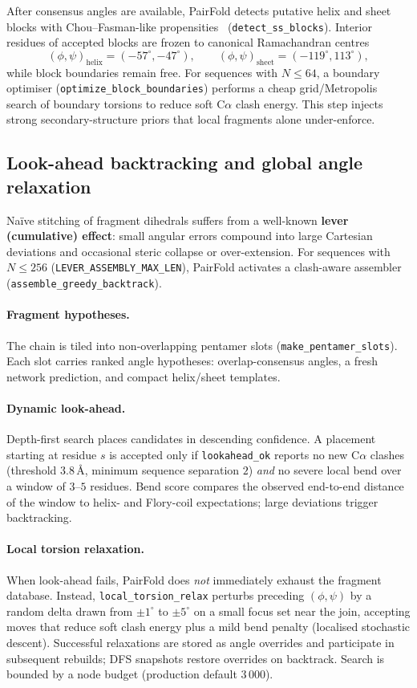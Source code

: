 \documentclass[11pt,a4paper]{article}
\begin{document}
After consensus angles are available, PairFold detects putative helix and sheet blocks with Chou--Fasman-like propensities~\citep{chou1974prediction} (\texttt{detect\_ss\_blocks}).
Interior residues of accepted blocks are frozen to canonical Ramachandran centres
\[
  (\phi,\psi)_{\mathrm{helix}} = (-57^\circ,-47^\circ),\qquad
  (\phi,\psi)_{\mathrm{sheet}} = (-119^\circ,113^\circ),
\]
while block boundaries remain free.
For sequences with $N\le 64$, a boundary optimiser (\texttt{optimize\_block\_boundaries}) performs a cheap grid/Metropolis search of boundary torsions to reduce soft C$\alpha$ clash energy.
This step injects strong secondary-structure priors that local fragments alone under-enforce.

\subsection{Look-ahead backtracking and global angle relaxation}
\label{sec:lever}

Na\"ive stitching of fragment dihedrals suffers from a well-known \textbf{lever (cumulative) effect}: small angular errors compound into large Cartesian deviations and occasional steric collapse or over-extension.
For sequences with $N\le 256$ (\texttt{LEVER\_ASSEMBLY\_MAX\_LEN}), PairFold activates a clash-aware assembler (\texttt{assemble\_greedy\_backtrack}).

\paragraph{Fragment hypotheses.}
The chain is tiled into non-overlapping pentamer slots (\texttt{make\_pentamer\_slots}).
Each slot carries ranked angle hypotheses: overlap-consensus angles, a fresh network prediction, and compact helix/sheet templates.

\paragraph{Dynamic look-ahead.}
Depth-first search places candidates in descending confidence.
A placement starting at residue $s$ is accepted only if \texttt{lookahead\_ok} reports no new C$\alpha$ clashes (threshold $3.8$\,\AA, minimum sequence separation $2$) \emph{and} no severe local bend over a window of $3$--$5$ residues.
Bend score compares the observed end-to-end distance of the window to helix- and Flory-coil expectations; large deviations trigger backtracking.

\paragraph{Local torsion relaxation.}
When look-ahead fails, PairFold does \emph{not} immediately exhaust the fragment database.
Instead, \texttt{local\_torsion\_relax} perturbs preceding $(\phi,\psi)$ by a random delta drawn from $\pm 1^\circ$ to $\pm 5^\circ$ on a small focus set near the join, accepting moves that reduce soft clash energy plus a mild bend penalty (localised stochastic descent).
Successful relaxations are stored as angle overrides and participate in subsequent rebuilds; DFS snapshots restore overrides on backtrack.
Search is bounded by a node budget (production default $3\,000$).
\end{document}
